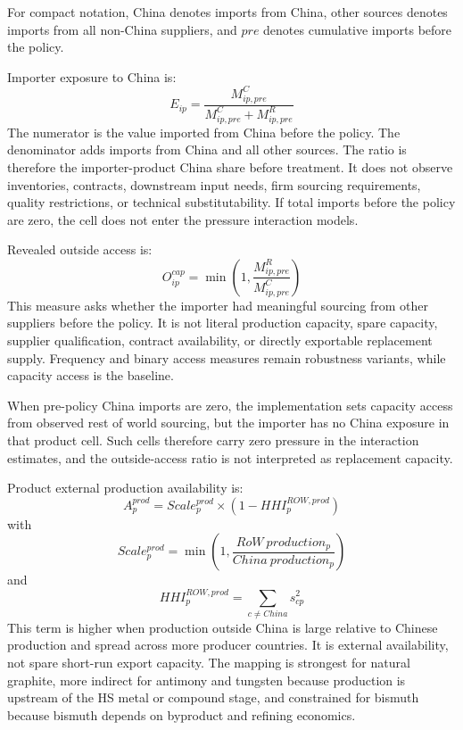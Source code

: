 \documentclass[12pt,a4paper]{article}
\numberwithin{equation}{section}
\begin{document}
For compact notation, China denotes imports from China, other sources denotes imports from all non-China suppliers, and \(pre\) denotes cumulative imports before the policy.

Importer exposure to China is:
\begin{equation}
E_{ip}=\frac{M^C_{ip,pre}}{M^C_{ip,pre}+M^R_{ip,pre}}
\end{equation}
The numerator is the value imported from China before the policy. The denominator adds imports from China and all other sources. The ratio is therefore the importer-product China share before treatment. It does not observe inventories, contracts, downstream input needs, firm sourcing requirements, quality restrictions, or technical substitutability. If total imports before the policy are zero, the cell does not enter the pressure interaction models.

Revealed outside access is:
\begin{equation}
O^{cap}_{ip}=\min\left(1,\frac{M^R_{ip,pre}}{M^C_{ip,pre}}\right)
\end{equation}
This measure asks whether the importer had meaningful sourcing from other suppliers before the policy. It is not literal production capacity, spare capacity, supplier qualification, contract availability, or directly exportable replacement supply. Frequency and binary access measures remain robustness variants, while capacity access is the baseline.

When pre-policy China imports are zero, the implementation sets capacity access from observed rest of world sourcing, but the importer has no China exposure in that product cell. Such cells therefore carry zero pressure in the interaction estimates, and the outside-access ratio is not interpreted as replacement capacity.

Product external production availability is:
\begin{equation}
A^{prod}_{p}=Scale^{prod}_{p}\times\left(1-HHI^{ROW,prod}_{p}\right)
\end{equation}
with
\begin{equation}
Scale^{prod}_{p}=\min\left(1,\frac{RoW\ production_p}{China\ production_p}\right)
\end{equation}
and
\begin{equation}
HHI^{ROW,prod}_{p}=\sum_{c\neq China}s_{cp}^{2}
\end{equation}
This term is higher when production outside China is large relative to Chinese production and spread across more producer countries. It is external availability, not spare short-run export capacity. The mapping is strongest for natural graphite, more indirect for antimony and tungsten because production is upstream of the HS metal or compound stage, and constrained for bismuth because bismuth depends on byproduct and refining economics.
\end{document}
